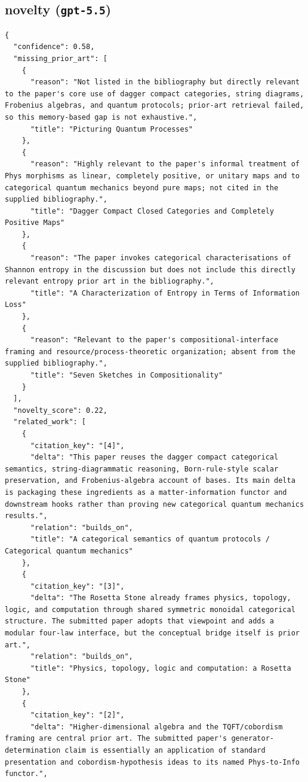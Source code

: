 \documentclass[11pt]{article}
\begin{document}
\subsection*{novelty (\texttt{gpt-5.5})}
\begin{verbatim}
{
  "confidence": 0.58,
  "missing_prior_art": [
    {
      "reason": "Not listed in the bibliography but directly relevant to the paper's core use of dagger compact categories, string diagrams, Frobenius algebras, and quantum protocols; prior-art retrieval failed, so this memory-based gap is not exhaustive.",
      "title": "Picturing Quantum Processes"
    },
    {
      "reason": "Highly relevant to the paper's informal treatment of Phys morphisms as linear, completely positive, or unitary maps and to categorical quantum mechanics beyond pure maps; not cited in the supplied bibliography.",
      "title": "Dagger Compact Closed Categories and Completely Positive Maps"
    },
    {
      "reason": "The paper invokes categorical characterisations of Shannon entropy in the discussion but does not include this directly relevant entropy prior art in the bibliography.",
      "title": "A Characterization of Entropy in Terms of Information Loss"
    },
    {
      "reason": "Relevant to the paper's compositional-interface framing and resource/process-theoretic organization; absent from the supplied bibliography.",
      "title": "Seven Sketches in Compositionality"
    }
  ],
  "novelty_score": 0.22,
  "related_work": [
    {
      "citation_key": "[4]",
      "delta": "This paper reuses the dagger compact categorical semantics, string-diagrammatic reasoning, Born-rule-style scalar preservation, and Frobenius-algebra account of bases. Its main delta is packaging these ingredients as a matter-information functor and downstream hooks rather than proving new categorical quantum mechanics results.",
      "relation": "builds_on",
      "title": "A categorical semantics of quantum protocols / Categorical quantum mechanics"
    },
    {
      "citation_key": "[3]",
      "delta": "The Rosetta Stone already frames physics, topology, logic, and computation through shared symmetric monoidal categorical structure. The submitted paper adopts that viewpoint and adds a modular four-law interface, but the conceptual bridge itself is prior art.",
      "relation": "builds_on",
      "title": "Physics, topology, logic and computation: a Rosetta Stone"
    },
    {
      "citation_key": "[2]",
      "delta": "Higher-dimensional algebra and the TQFT/cobordism framing are central prior art. The submitted paper's generator-determination claim is essentially an application of standard presentation and cobordism-hypothesis ideas to its named Phys-to-Info functor.",

\end{verbatim}
\end{document}
